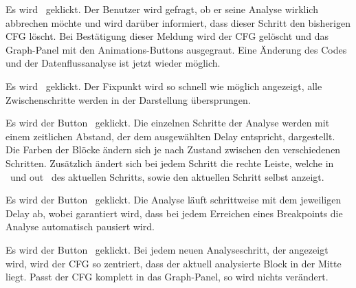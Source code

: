 

{Es wird \faStop\ geklickt.}
{Der Benutzer wird gefragt, ob er seine Analyse wirklich abbrechen möchte und wird darüber informiert, dass dieser Schritt den bisherigen CFG löscht. Bei Bestätigung dieser Meldung wird der CFG gelöscht und das Graph-Panel mit den Animations-Buttons ausgegraut. Eine Änderung des Codes und der Datenflussanalyse ist jetzt wieder möglich.}



{Es wird \faPlay\ geklickt.}
{Der Fixpunkt wird so schnell wie möglich angezeigt, alle Zwischenschritte werden in der Darstellung übersprungen.}

{Es wird der Button \faPlay\ geklickt.}
{Die einzelnen Schritte der Analyse werden mit einem zeitlichen Abstand, der dem ausgewählten Delay entspricht, dargestellt. Die Farben der Blöcke ändern sich je nach Zustand zwischen den verschiedenen Schritten. Zusätzlich ändert sich bei jedem Schritt die rechte Leiste, welche \glqq in \grqq\ und \glqq out \grqq\ des aktuellen Schritts, sowie den aktuellen Schritt selbst anzeigt.}

{Es wird der Button \faPlay\ geklickt.}
{Die Analyse läuft schrittweise mit dem jeweiligen Delay ab, wobei garantiert wird, dass bei jedem Erreichen eines Breakpoints die Analyse automatisch pausiert wird.}

{Es wird der Button \faPlay\ geklickt.}
{Bei jedem neuen Analyseschritt, der angezeigt wird, wird der CFG so zentriert, dass der aktuell analysierte Block in der Mitte liegt. Passt der CFG komplett in das Graph-Panel, so wird nichts verändert.}




